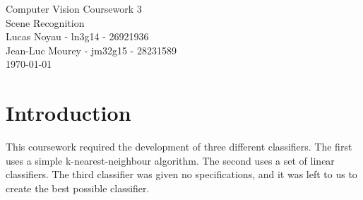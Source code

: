 \documentclass[a4paper,12pt]{article}
\begin{document}
\begin{center}
{\Large Computer Vision Coursework 3} \\
{\Large Scene Recognition} \\
Lucas Noyau - ln3g14 - 26921936\\
Jean-Luc Mourey - jm32g15 - 28231589\\
\today
\end{center}


\section{Introduction}
This coursework required the development of three different classifiers. The first uses a simple k-nearest-neighbour algorithm. The second uses a set of linear classifiers. The third classifier was given no specifications, and it was left to us to create the best possible classifier.

\end{document}
